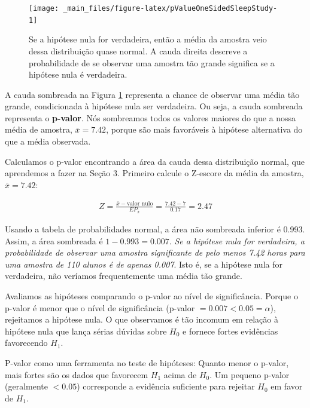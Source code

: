 \documentclass[
]{book}
\theoremstyle{definition}
\theoremstyle{definition}
\theoremstyle{definition}
\theoremstyle{definition}
\theoremstyle{remark}
\begin{document}
\begin{figure}

{\centering \texttt{[image: \_main\_files/figure-latex/pValueOneSidedSleepStudy-1]} 

}

\caption{Se a hipótese nula for verdadeira, então a média da amostra veio dessa distribuição quase normal. A cauda direita descreve a probabilidade de se observar uma amostra tão grande significa se a hipótese nula é verdadeira.}\label{fig:pValueOneSidedSleepStudy}
\end{figure}

A cauda sombreada na Figura \ref{fig:pValueOneSidedSleepStudy} representa a chance de observar uma média tão grande, condicionada à hipótese nula ser verdadeira. Ou seja, a cauda sombreada representa o \textbf{p-valor}. Nós sombreamos todos os valores maiores do que a nossa média de amostra, \(\bar{x} = 7.42\), porque são mais favoráveis à hipótese alternativa do que a média observada.

Calculamos o p-valor encontrando a área da cauda dessa distribuição normal, que aprendemos a fazer na Seção 3. Primeiro calcule o Z-escore da média da amostra, \(\bar{x} = 7.42\):

\begin{eqnarray*}
Z = \frac{\bar{x} - \text{valor nulo}}{EP_{\bar{x}}} = \frac{7.42 - 7}{0.17} = 2.47
\end{eqnarray*}

Usando a tabela de probabilidades normal, a área não sombreada inferior é 0.993. Assim, a área sombreada é \(1-0.993 = 0.007\). \emph{Se a hipótese nula for verdadeira, a probabilidade de observar uma amostra significante de pelo menos 7.42 horas para uma amostra de 110 alunos é de apenas 0.007}. Isto é, se a hipótese nula for verdadeira, não veríamos frequentemente uma média tão grande.

Avaliamos as hipóteses comparando o p-valor ao nível de significância. Porque o p-valor é menor que o nível de significância (p-valor \(= 0.007 < 0.05 = \alpha\)), rejeitamos a hipótese nula. O que observamos é tão incomum em relação à hipótese nula que lança sérias dúvidas sobre \(H_0\) e fornece fortes evidências favorecendo \(H_1\).

P-valor como uma ferramenta no teste de hipóteses: Quanto menor o p-valor, mais fortes são os dados que favorecem \(H_1\) acima de \(H_0\). Um pequeno p-valor (geralmente \(<0.05\)) corresponde a evidência suficiente para rejeitar \(H_0\) em favor de \(H_1\).
\end{document}
